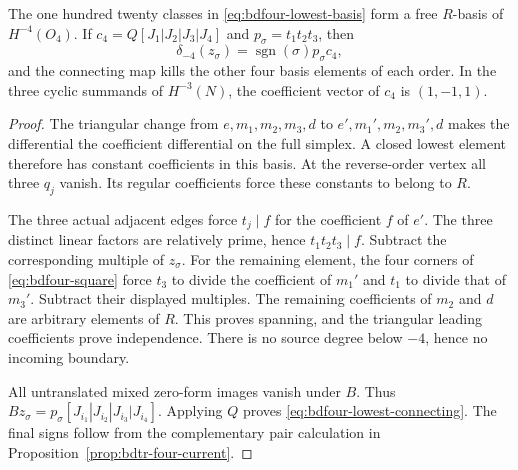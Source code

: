 \begin{proposition}\label{prop:bdfour-lowest}
The one hundred twenty classes in \eqref{eq:bdfour-lowest-basis} form a free $R$-basis of $H^{-4}(O_4)$.
If $c_4=Q[J_1|J_2|J_3|J_4]$ and $p_\sigma=t_1t_2t_3$, then
\begin{equation}\label{eq:bdfour-lowest-connecting}
 \delta_{-4}(z_\sigma)=\operatorname{sgn}(\sigma)p_\sigma c_4,
\end{equation}
and the connecting map kills the other four basis elements of each order.
In the three cyclic summands of $H^{-3}(N)$, the coefficient vector of $c_4$ is $(1,-1,1)$.
\end{proposition}
\begin{proof}
The triangular change from $e,m_1,m_2,m_3,d$ to $e',m_1',m_2,m_3',d$ makes the differential the coefficient differential on the full simplex.
A closed lowest element therefore has constant coefficients in this basis.
At the reverse-order vertex all three $q_j$ vanish.
Its regular coefficients force these constants to belong to $R$.

The three actual adjacent edges force $t_j\mid f$ for the coefficient $f$ of $e'$.
The three distinct linear factors are relatively prime, hence $t_1t_2t_3\mid f$.
Subtract the corresponding multiple of $z_\sigma$.
For the remaining element, the four corners of \eqref{eq:bdfour-square} force $t_3$ to divide the coefficient of $m_1'$ and $t_1$ to divide that of $m_3'$.
Subtract their displayed multiples.
The remaining coefficients of $m_2$ and $d$ are arbitrary elements of $R$.
This proves spanning, and the triangular leading coefficients prove independence.
There is no source degree below $-4$, hence no incoming boundary.

All untranslated mixed zero-form images vanish under $B$.
Thus $Bz_\sigma=p_\sigma[J_{i_1}|J_{i_2}|J_{i_3}|J_{i_4}]$.
Applying $Q$ proves \eqref{eq:bdfour-lowest-connecting}.
The final signs follow from the complementary pair calculation in Proposition~\ref{prop:bdtr-four-current}.
\end{proof}

